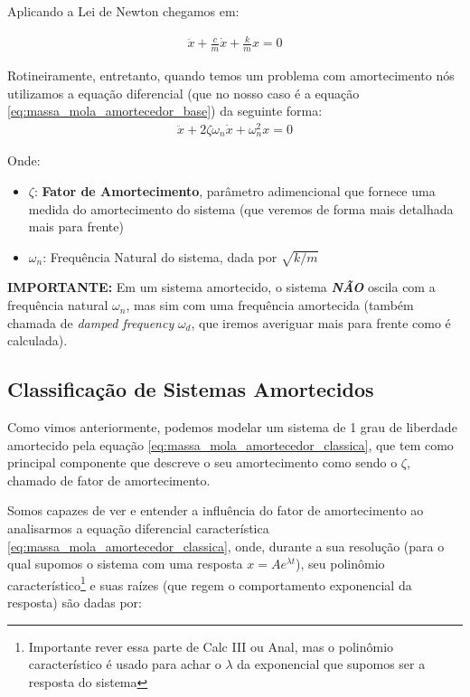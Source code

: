 \documentclass{article}
\begin{document}
Aplicando a Lei de Newton chegamos em:

\begin{align}
    \ddot x + \frac{c}{m}\dot x + \frac{k}{m}x = 0 \label{eq:massa_mola_amortecedor_base}
\end{align}

Rotineiramente, entretanto, quando temos um problema com amortecimento nós utilizamos a equação diferencial (que no nosso caso é a equação \ref{eq:massa_mola_amortecedor_base}) da seguinte
forma:
\begin{align}
    \ddot x + 2\zeta \omega_n\dot x + \omega_n^2 x = 0 \label{eq:massa_mola_amortecedor_classica}
\end{align}

Onde:
\begin{itemize}
    \item $\zeta$: \textbf{Fator de Amortecimento}, parâmetro adimencional que fornece uma medida do amortecimento do sistema (que veremos de forma mais detalhada mais para frente)
    \item $\omega_n$: Frequência Natural do sistema, dada por $\sqrt{k/m}$
\end{itemize}

\textbf{IMPORTANTE:} Em um sistema amortecido, o sistema \textbf{\emph{NÃO}} oscila com a frequência natural $\omega_n$, mas sim com uma frequência amortecida (também chamada de
\emph{damped frequency} $\omega_d$, que iremos averiguar mais para frente como é calculada).
\newpage

\subsection{Classificação de Sistemas Amortecidos}
Como vimos anteriormente, podemos modelar um sistema de 1 grau de liberdade amortecido pela equação \ref{eq:massa_mola_amortecedor_classica}, que tem como principal componente que
descreve o seu amortecimento como sendo o $\zeta$, chamado de fator de amortecimento.

Somos capazes de ver e entender a influência do fator de amortecimento ao analisarmos a equação diferencial característica \ref{eq:massa_mola_amortecedor_classica}, onde,
durante a sua resolução (para o qual supomos o sistema com uma resposta $x=Ae^{\lambda t}$), seu polinômio característico\footnote{Importante rever essa parte de Calc III ou Anal, mas o
    polinômio característico é usado para achar o $\lambda$ da exponencial que supomos ser a resposta do sistema} e suas raízes (que regem o comportamento exponencial da resposta) são dadas por:
\end{document}
